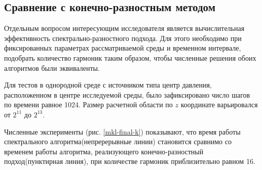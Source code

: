 \subsection{Сравнение с конечно-разностным методом}

Отдельным вопросом интересующим исследователя является вычислительная эффективность спектрально-разностного подхода.
Для этого необходимо при фиксированных параметрах рассматриваемой среды и временном интервале, подобрать количество гармоник таким образом,
чтобы численные решения обоих алгоритмов были эквиваленты.

Для тестов в однородной среде с источником типа центр давления, расположенном в центре исследуемой среды,
было зафиксировано число шагов по времени равное 1024. Размер расчетной области по $z$ координате варьировался от $2^{11}$ до $2^{13}$.


Численные эксперименты (рис. \ref{mkl-final-k}) показывают, что время работы спектрального алгоритма(непререрывные линии) становится сравнимо со временем работы алгоритма, реализующего конечно-разностный подход(пунктирная линия), при количестве гармоник приблизительно равном 16.

\clearpage
